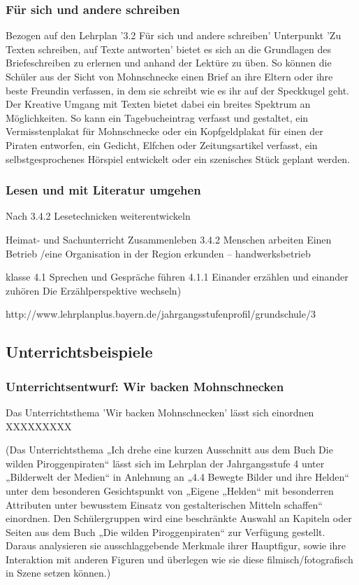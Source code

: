 {\subsubsection{Für sich und andere schreiben}

Bezogen auf den Lehrplan '3.2 Für sich und andere schreiben' Unterpunkt 'Zu Texten schreiben, auf Texte antworten' bietet es sich an die Grundlagen des Briefeschreiben zu erlernen und anhand der Lektüre zu üben. So können die Schüler aus der Sicht von Mohnschnecke einen Brief an ihre Eltern oder ihre beste Freundin verfassen, in dem sie schreibt wie es ihr auf der Speckkugel geht. Der Kreative Umgang mit Texten bietet dabei ein breites Spektrum an Möglichkeiten. So kann ein Tagebucheintrag verfasst und gestaltet, ein Vermisstenplakat für Mohnschnecke oder ein Kopfgeldplakat für einen der Piraten entworfen, ein Gedicht, Elfchen oder Zeitungsartikel verfasst, ein selbstgesprochenes Hörspiel entwickelt oder ein szenisches Stück geplant werden.

\subsubsection{Lesen und mit Literatur umgehen}

Nach 3.4.2 Lesetechnicken weiterentwickeln 

Heimat- und Sachunterricht
Zusammenleben   3.4.2 Menschen arbeiten Einen Betrieb /eine Organisation in der Region erkunden   –  handwerksbetrieb


klasse
4.1 Sprechen und Gespräche führen 
4.1.1 Einander erzählen und einander zuhören   
Die Erzählperspektive wechseln)

http://www.lehrplanplus.bayern.de/jahrgangsstufenprofil/grundschule/3

\subsection{Unterrichtsbeispiele}



\subsubsection{Unterrichtsentwurf: Wir backen Mohnschnecken}

Das Unterrichtsthema 'Wir backen Mohnschnecken' lässt sich einordnen XXXXXXXXX

(Das Unterrichtsthema „Ich drehe eine kurzen Ausschnitt aus dem Buch Die wilden  Piroggenpiraten“ lässt sich im Lehrplan der Jahrgangsstufe 4 unter „Bilderwelt der Medien“ in Anlehnung an „4.4 Bewegte Bilder und ihre Helden“ unter dem besonderen Gesichtspunkt von „Eigene „Helden“ mit besonderren Attributen unter bewusstem Einsatz von gestalterischen Mitteln schaffen“ einordnen. Den Schülergruppen wird eine beschränkte Auswahl an Kapiteln oder Seiten aus dem Buch „Die wilden Piroggenpiraten“ zur Verfügung gestellt. Daraus analysieren sie ausschlaggebende Merkmale ihrer Hauptfigur, sowie ihre Interaktion mit anderen Figuren und überlegen wie sie diese filmisch/fotografisch in Szene setzen können.)

}
